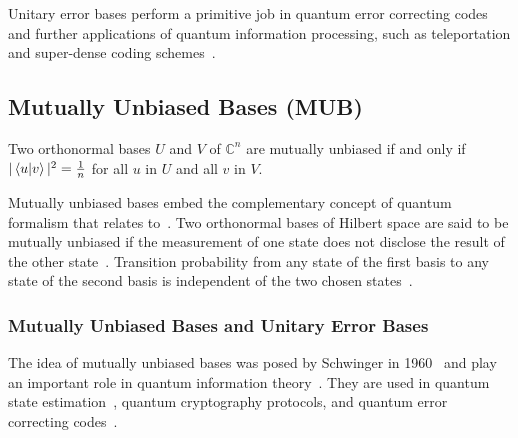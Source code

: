 \noindent Unitary error bases perform a primitive job in quantum error correcting codes and further applications of quantum information processing, such as teleportation and super-dense coding schemes~\cite{klappenecker2003UnitaryErrorBases}.

\subsection{Mutually Unbiased Bases (MUB)}

\begin{definition}
Two orthonormal bases $U$ and $V$ of $\mathbb{C}^n$ are mutually unbiased if and only if $|\braket{u|v}|^2 = \frac{1}{n}$ for all $u$ in $U$ and all $v$ in $V$.
\end{definition}

\noindent Mutually unbiased bases embed the complementary concept of quantum formalism that relates to~\cite{paterek2010ConnectionMutuallyUnbiased}.
Two orthonormal bases of Hilbert space are said to be mutually unbiased if the measurement of one state does not disclose the result of the other state~\cite{song2020ConstructionMutuallyUnbiased}.
Transition probability from any state of the first basis to any state of the second basis is independent of the two chosen states~\cite{song2020ConstructionMutuallyUnbiased}.


\subsubsection*{Mutually Unbiased Bases and Unitary Error Bases}
The idea of mutually unbiased bases was posed by Schwinger in 1960~\cite{schwinger1960UnitaryOperatorBases} and play an important role in quantum information theory~\cite{klappenecker2004ConstructionsMutuallyUnbiased}.
They are used in quantum state estimation~\cite{adamson2008ExperimentalQuantumState, grassl2005TomographyQuantumStates}, quantum cryptography protocols, and quantum error correcting codes~\cite{cerf2002SecurityQuantumKey}.

